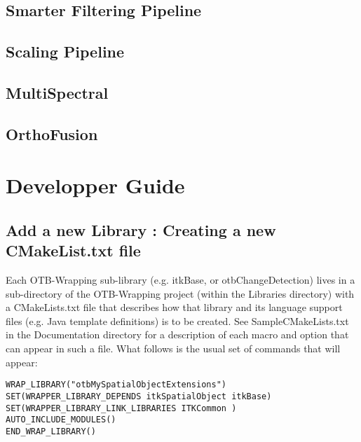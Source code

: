 \subsection{Smarter Filtering Pipeline}


\subsection{Scaling Pipeline}


\subsection{MultiSpectral}


\subsection{OrthoFusion}



\section{Developper Guide}\label{sec:dev}

\subsection{Add a new Library : Creating a new CMakeList.txt file}
Each OTB-Wrapping sub-library (e.g. itkBase, or otbChangeDetection) 
lives in a sub-directory of the OTB-Wrapping project (within the Libraries directory)
 with a CMakeLists.txt file that describes how that library and its language support files 
(e.g. Java template definitions) is to be created. 
See SampleCMakeLists.txt in the Documentation directory for a description of each macro and option that
can appear in such a file. What follows is the usual set of commands that will appear:

\small
\verb$WRAP_LIBRARY("otbMySpatialObjectExtensions")$ \\
\verb$SET(WRAPPER_LIBRARY_DEPENDS itkSpatialObject itkBase)$ \\
\verb$SET(WRAPPER_LIBRARY_LINK_LIBRARIES ITKCommon )$ \\
\verb$AUTO_INCLUDE_MODULES()$ \\
\verb$END_WRAP_LIBRARY()$ \\
\normalsize


